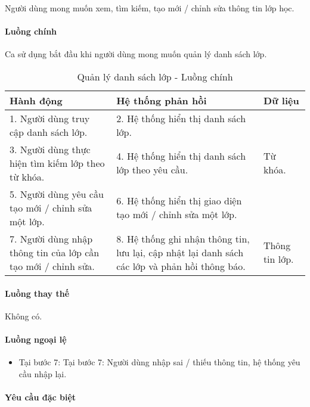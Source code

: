 \documentclass[./../main.tex]{subfiles}
\begin{document}
Người dùng mong muốn xem, tìm kiếm, tạo mới / chỉnh sửa thông tin lớp học.

\paragraph*{Luồng chính} Ca sử dụng bắt đầu khi người dùng mong muốn quản lý danh sách lớp.

\begin{table}[H]
  \caption{Quản lý danh sách lớp - Luồng chính}
  \label{tab:admin_manage_classes}
  \begin{tabularx}{\textwidth}{|X|X|X|}
    \hline
    \textbf{Hành động} & \textbf{Hệ thống phản hồi} & \textbf{Dữ liệu} \\ \hline
1. Người dùng truy cập danh sách lớp. & 2. Hệ thống hiển thị danh sách lớp. &  \\ \hline
3. Người dùng thực hiện tìm kiếm lớp theo từ khóa. & 4. Hệ thống hiển thị danh sách lớp theo yêu cầu. & Từ khóa. \\ \hline
5. Người dùng yêu cầu tạo mới / chỉnh sửa một lớp. & 6. Hệ thống hiển thị giao diện tạo mới / chỉnh sửa một lớp. &  \\ \hline
7. Người dùng nhập thông tin của lớp cần tạo mới / chỉnh sửa. & 8. Hệ thống ghi nhận thông tin, lưu lại, cập nhật lại danh sách các lớp và phản hồi thông báo. & Thông tin lớp. \\ \hline
  \end{tabularx}
\end{table}

\paragraph*{Luồng thay thế} Không có.

\paragraph*{Luồng ngoại lệ}

\begin{itemize}
  \item
    
  Tại bước 7: Tại bước 7: Người dùng nhập sai / thiếu thông tin, hệ thống yêu cầu nhập lại.
  
\end{itemize}

\paragraph*{Yêu cầu đặc biệt}
\end{document}
